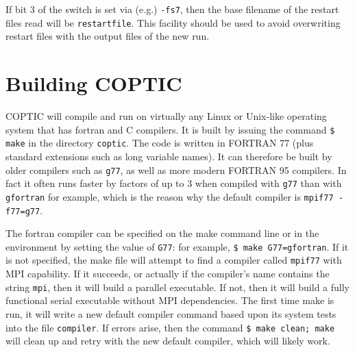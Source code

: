 \documentclass[12pt]{article}
\begin{document}
If bit 3 of the switch is set via (e.g.) \verb!-fs7!, then the base
filename of the restart files read will be \verb!restartfile!. This
facility should be used to avoid overwriting restart files with the
output files of the new run.

\section{Building COPTIC}\label{building}

COPTIC will compile and run on virtually any Linux or Unix-like
operating system that has fortran and C compilers. It is built by
issuing the command \verb!$ make! in the directory \verb!coptic!. The
code is written in FORTRAN 77 (plus standard extensions such as long
variable names). It can therefore be built by older compilers such as
\verb!g77!, as well as more modern FORTRAN 95 compilers. In fact it
often runs faster by factors of up to 3 when compiled with \verb!g77!
than with \verb!gfortran! for example, which is the reason why the
default compiler is \verb!mpif77 -f77=g77!.

The fortran compiler can be specified on the make command line or in
the environment by setting the value of \verb!G77!: for example,
\verb!$ make G77=gfortran!.  If it is not specified, the make file
will attempt to find a compiler called \verb!mpif77! with MPI
capability.  If it succeeds, or actually if the compiler's name
contains the string \verb!mpi!, then it will build a parallel
executable. If not, then it will build a fully functional serial
executable without MPI dependencies. The first time make is run, it
will write a new default compiler command based upon its system tests
into the file \verb!compiler!. If errors arise, then the command
\verb!$ make clean; make! will clean up and retry with the new default
compiler, which will likely work.
\end{document}
